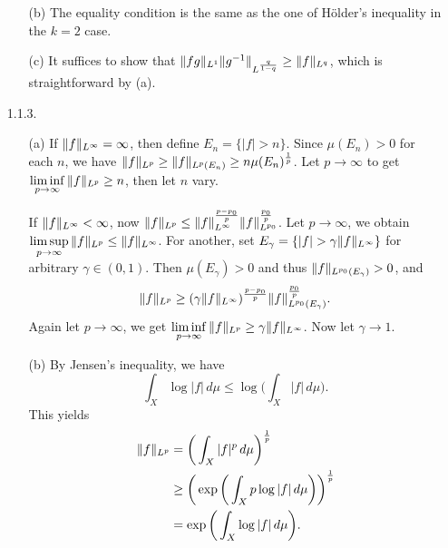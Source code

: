 \begin{enumerate}
\begin{enumerate}
    \item[(b)] The equality condition is the same as 
    the one of Hölder's inequality in the $k=2$ case.

    \item[(c)] It suffices to show that $\norm{fg}_{L^1}\norm{g^{-1}}_{L^\frac{q}{1-q}} \geq \norm{f}_{L^q}$, 
    which is straightforward by (a).
    \end{enumerate}

\item[1.1.3.]
    \begin{enumerate}
    \item[(a)] If $\Vert f \Vert_{L^\infty} = \infty$, then define $E_{n}=\{|f|>n\}$. 
    Since $\mu(E_{n})>0$ for each $n$, we have 
    $\Vert f \Vert_{L^p} \geq \Vert f \Vert_{L^p(E_n)}\geq n\mu(E_n)^{\frac{1}{p}}$. 
    Let $p \rightarrow \infty$ to get 
    $\liminf\limits_{p \rightarrow \infty}\Vert f \Vert_{L^p} \geq n$, 
    then let $n$ vary. \par
    If $\Vert f \Vert_{L^\infty} < \infty$, now $\Vert f \Vert_{L^p} 
    \leq \Vert f \Vert_{L^\infty}^{\frac{p-p_0}{p}}\Vert f \Vert_{L^{p_0}}^{\frac{p_0}{p}}$. 
    Let $p \rightarrow \infty$, we obtain 
    $\limsup\limits_{p \rightarrow \infty}\Vert f \Vert_{L^p} \leq \Vert f \Vert_{L^\infty}$. 
    For another, set $E_{\gamma}=\{|f|>\gamma\norm{f}_{L^\infty}\}$ 
    for arbitrary $\gamma \in (0,1)$. 
    Then $\mu(E_{\gamma})>0$ and thus $\Vert f \Vert_{L^{p_0}(E_{\gamma})}>0$, and 
    \[\Vert f \Vert_{L^p} \geq (\gamma\Vert f \Vert_{L^\infty})^{\frac{p-p_0}{p}}
    \Vert f \Vert_{L^{p_0}(E_{\gamma})}^{\frac{p_0}{p}}.\]
    Again let $p \rightarrow \infty$, we get 
    $\liminf\limits_{p \rightarrow \infty}\Vert f \Vert_{L^p} 
    \geq \gamma\Vert f \Vert_{L^\infty}$. Now let $\gamma \rightarrow 1$.
    
    \item[(b)] By Jensen's inequality, we have
    \[\int_{X}\log |f| \,d\mu \leq \log\bigg(\int_{X}|f|\,d\mu\bigg).\]
    This yields
    \begin{align*}\Vert f \Vert_{L^p}&=\bigg(\int_{X}|f|^{p}\,d\mu\bigg)^{\frac{1}{p}}\\
    &\ge\bigg(\exp\bigg(\int_{X}p\log|f| \,d\mu\bigg)\bigg)^{\frac{1}{p}}\\
    &=\exp\bigg(\int_{X}\log|f| \,d\mu\bigg).\end{align*}
    

\end{enumerate}
\end{enumerate}
